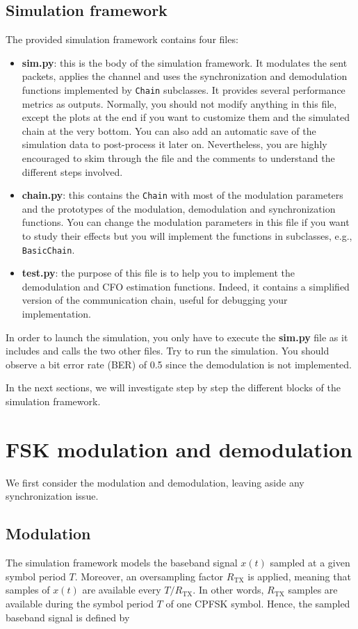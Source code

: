 \subsection{Simulation framework}
The provided simulation framework contains four files:
\begin{itemize}
    \item \textbf{sim.py}: this is the body of the simulation framework. It modulates the sent packets, applies the channel and uses the synchronization and demodulation functions implemented by \texttt{Chain} subclasses. It provides several performance metrics as outputs. Normally, you should not modify anything in this file, except the plots at the end if you want to customize them and the simulated chain at the very bottom. You can also add an automatic save of the simulation data to post-process it later on. Nevertheless, you are highly encouraged to skim through the file and the comments to understand the different steps involved.
    \item \textbf{chain.py}: this contains the \texttt{Chain} with most of the modulation parameters and the prototypes of the modulation, demodulation and synchronization functions. You can change the modulation parameters in this file if you want to study their effects but you will implement the functions in subclasses, e.g., \texttt{BasicChain}.
    \item \textbf{test.py}: the purpose of this file is to help you to implement the demodulation and CFO estimation functions. Indeed, it contains a simplified version of the communication chain, useful for debugging your implementation.
\end{itemize}

In order to launch the simulation, you only have to execute the \textbf{sim.py} file as it includes and calls the two other files. Try to run the simulation. You should observe a bit error rate (BER) of 0.5 since the demodulation is not implemented.

In the next sections, we will investigate step by step the different blocks of the simulation framework.

\section{FSK modulation and demodulation}
We first consider the modulation and demodulation, leaving aside any synchronization issue.

\subsection{Modulation}
The simulation framework models the baseband signal $x(t)$ sampled at a given symbol period $T$. Moreover, an oversampling factor $R_{\text{TX}}$ is applied, meaning that samples of $x(t) $ are available every $T/R_{\text{TX}}$. In other words, $R_{\text{TX}}$ samples are available during the symbol period $T$ of one CPFSK symbol. Hence, the sampled baseband signal is defined by

